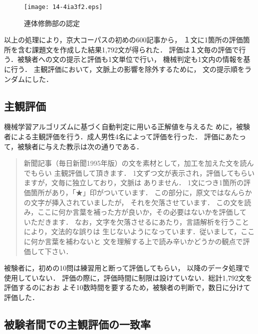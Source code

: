 \documentclass[japanese]{jnlp_1.3e}
\begin{document}
\begin{figure}[b]
  \begin{center}
    \texttt{[image: 14-4ia3f2.eps]}
  \end{center}
  \caption{連体修飾部の認定}
  \label{fig:連体修飾部}
\end{figure}

以上の処理により，京大コーパスの初めの600記事から，
１文に1箇所の評価箇所を含む課題文を作成した結果1,792文が得られた．
評価は１文毎の評価で行う．被験者への文の提示と評価も1文単位で行い，
機械判定も1文内の情報を基に行う．
主観評価において，文脈上の影響を除外するために，
文の提示順をランダムにした．


\subsection{主観評価}

機械学習アルゴリズムに基づく自動判定に用いる正解値を与えるた
めに，被験者による主観評価を行う．成人男性4名によって評価を行った．
評価にあたって，被験者に与えた教示は次の通りである．
\begin{quote}
 新聞記事（毎日新聞1995年版）の文を素材として，加工を加えた文を読んでもらい
 主観評価して頂きます．
 1文ずつ文が表示され，評価してもらいますが，文毎に独立しており，文脈は
 ありません．
 1文につき1箇所の評価箇所があり，「★」印がついています．
 この部分に，原文ではなんらかの文字が挿入されていましたが，
 それを欠落させています．
 この文を読み，ここに何か言葉を補った方が良いか，その必要はないかを評価して
 いただきます．
 なお，文字を欠落させるにあたり，言語解析を行うことにより，文法的な誤りは
 生じないようになっています．従いまして，ここに何か言葉を補わないと
 文を理解する上で読み辛いかどうかの観点で評価して下さい．
\end{quote}
被験者に，初めの10問は練習用と断って評価してもらい，
以降のデータ処理で使用していない．
評価の際に，評価時間に制限は設けていない．総計1,792文を評価するのにおお
よそ10数時間を要するため，被験者の判断で，数日に分けて評価した．


\subsection{被験者間での主観評価の一致率} 
\label{label:主観評価の一致率}
\end{document}
